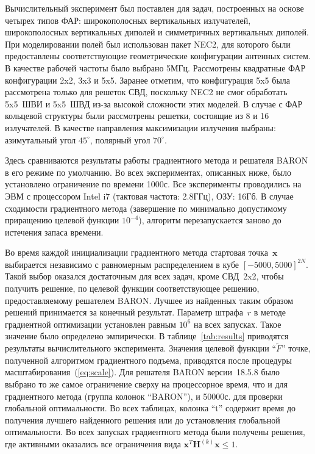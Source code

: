Вычислительный эксперимент был поставлен для задач, построенных на основе четырех типов ФАР: широкополосных вертикальных излучателей, широкополосных вертикальных диполей и симметричных вертикальных диполей. При моделировании полей был использован пакет NEC2, для которого были предоставлены соответствующие геометрические конфигурации антенных систем. В качестве рабочей частоты было выбрано 5МГц. Рассмотрены квадратные ФАР конфигурации 2x2, 3x3 и 5x5. Заранее отметим, что конфигурация 5x5 была рассмотрена только для решеток СВД, поскольку NEC2 не смог обработать 5x5~ШВИ и 5x5~ШВД из-за высокой сложности этих моделей. В случае с ФАР кольцевой структуры были рассмотрены решетки, состоящие из 8 и 16 излучателей. В качестве направления максимизации излучения выбраны: азимутальный угол $45^{\circ}$, полярный угол $70^{\circ}$.

Здесь сравниваются результаты работы градиентного метода и решателя BARON в его режиме по умолчанию. Во всех экспериментах, описанных ниже, было установлено ограничение по времени 1000с. Все эксперименты проводились на ЭВМ с процессором Intel i7 (тактовая частота: 2.8ГГц), ОЗУ: 16Гб. В случае сходимости градиентного метода (завершение по минимально допустимому приращению целевой функции $10^{-4}$), алгоритм перезапускается заново до истечения запаса времени.

Во время каждой инициализации градиентного метода стартовая точка~$\textbf{x}$ выбирается независимо с равномерным распределением в кубе $[-5000, 5000]^{2N}$. Такой выбор оказался достаточным для всех задач, кроме СВД~2x2, чтобы получить решение, по целевой функции соответствующее решению, предоставляемому решателем BARON. Лучшее из найденных таким образом решений принимается за конечный результат. Параметр штрафа~$r$ в методе градиентной оптимизации установлен равным $10^6$ на всех запусках. Такое значение было определено эмпирически. В таблице~\ref{tab:results} приводятся результаты вычислительного эксперимента. Значения целевой функции ``$\tilde{F}$'' точке, полученной алгоритмом градиентного подъема, приводятся после процедуры масштабирования~(\ref{eq:scale}). Для решателя BARON версии~18.5.8 было выбрано то же самое ограничение сверху на процессорное время, что и для градиентного метода (группа колонок ``BARON''), и 50000с. для проверки глобальной оптимальности. Во всех таблицах, колонка ``t'' содержит время до получения лучшего найденного решения или до установления глобальной оптимальности. Во всех запусках градиентного метода были получены решения, где активными оказались все ограничения вида $\textbf{x}^{T}\textbf{H}^{(k)}\textbf{x} \leq 1$.

